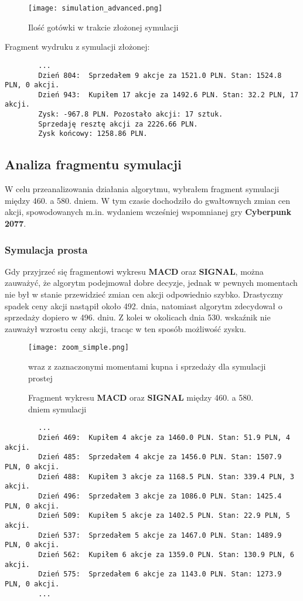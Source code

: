 \documentclass{article}
\begin{document}
    \begin{figure}[H]
        \texttt{[image: simulation\_advanced.png]}
        \centering
        \caption{Ilość gotówki w trakcie złożonej symulacji}
    \end{figure}

Fragment wydruku z symulacji złożonej:
    \begin{verbatim}
        ...
        Dzień 804:  Sprzedałem 9 akcje za 1521.0 PLN. Stan: 1524.8 PLN, 0 akcji.
        Dzień 943:  Kupiłem 17 akcje za 1492.6 PLN. Stan: 32.2 PLN, 17 akcji.
        Zysk: -967.8 PLN. Pozostało akcji: 17 sztuk.
        Sprzedaję resztę akcji za 2226.66 PLN.
        Zysk końcowy: 1258.86 PLN.
    \end{verbatim}

    \subsection{Analiza fragmentu symulacji}
    W celu przeanalizowania działania algorytmu, wybrałem fragment symulacji między 460. a 580. dniem. 
    W tym czasie dochodziło do gwałtownych zmian cen akcji, spowodowanych m.in. wydaniem wcześniej wspomnianej
    gry \textbf{Cyberpunk 2077}.

    \subsubsection{Symulacja prosta}
    Gdy przyjrzeć się fragmentowi wykresu \textbf{MACD} oraz \textbf{SIGNAL}, można zauważyć, że
    algorytm podejmował dobre decyzje, jednak w pewnych momentach nie był w stanie przewidzieć
    zmian cen akcji odpowiednio szybko. Drastyczny spadek ceny akcji nastąpił około 492. dnia, 
    natomiast algorytm zdecydował o sprzedaży dopiero w 496. dniu. 
    Z kolei w okolicach dnia 530. wskaźnik nie zauważył wzrostu ceny akcji,
    tracąc w ten sposób możliwość zysku.

    \begin{figure}[H]
        \texttt{[image: zoom\_simple.png]}
        \centering
        \caption{Fragment wykresu \textbf{MACD} oraz \textbf{SIGNAL} między 460. a 580. dniem symulacji}{ wraz z zaznaczonymi momentami kupna i sprzedaży
        dla symulacji prostej}
    \end{figure}

    \begin{verbatim}
        ...
        Dzień 469:  Kupiłem 4 akcje za 1460.0 PLN. Stan: 51.9 PLN, 4 akcji.
        Dzień 485:  Sprzedałem 4 akcje za 1456.0 PLN. Stan: 1507.9 PLN, 0 akcji.
        Dzień 488:  Kupiłem 3 akcje za 1168.5 PLN. Stan: 339.4 PLN, 3 akcji.
        Dzień 496:  Sprzedałem 3 akcje za 1086.0 PLN. Stan: 1425.4 PLN, 0 akcji.
        Dzień 509:  Kupiłem 5 akcje za 1402.5 PLN. Stan: 22.9 PLN, 5 akcji.
        Dzień 537:  Sprzedałem 5 akcje za 1467.0 PLN. Stan: 1489.9 PLN, 0 akcji.
        Dzień 562:  Kupiłem 6 akcje za 1359.0 PLN. Stan: 130.9 PLN, 6 akcji.
        Dzień 575:  Sprzedałem 6 akcje za 1143.0 PLN. Stan: 1273.9 PLN, 0 akcji.
        ...
    \end{verbatim}
\end{document}
